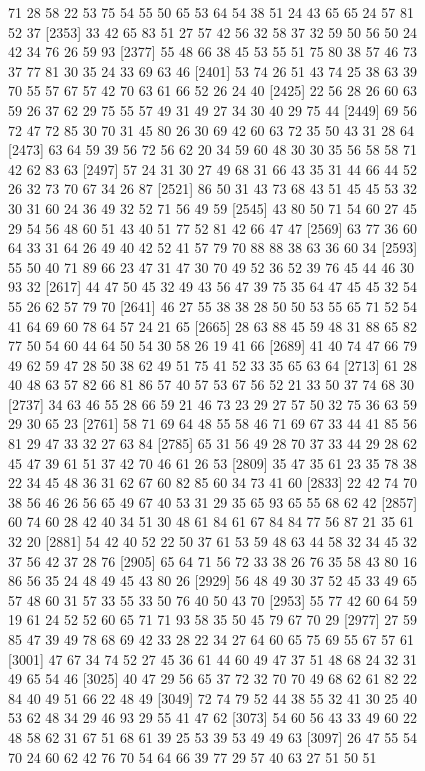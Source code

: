\documentclass{article}
\begin{document}
\begin{figure}[H]
\begin{Schunk}
\begin{Soutput}
 [2329] 71 28 58 22 53 75 54 55 50 65 53 64 54 38 51 24 43 65 65 24 57 81 52 37
 [2353] 33 42 65 83 51 27 57 42 56 32 58 37 32 59 50 56 50 24 42 34 76 26 59 93
 [2377] 55 48 66 38 45 53 55 51 75 80 38 57 46 73 37 77 81 30 35 24 33 69 63 46
 [2401] 53 74 26 51 43 74 25 38 63 39 70 55 57 67 57 42 70 63 61 66 52 26 24 40
 [2425] 22 56 28 26 60 63 59 26 37 62 29 75 55 57 49 31 49 27 34 30 40 29 75 44
 [2449] 69 56 72 47 72 85 30 70 31 45 80 26 30 69 42 60 63 72 35 50 43 31 28 64
 [2473] 63 64 59 39 56 72 56 62 20 34 59 60 48 30 30 35 56 58 58 71 42 62 83 63
 [2497] 57 24 31 30 27 49 68 31 66 43 35 31 44 66 44 52 26 32 73 70 67 34 26 87
 [2521] 86 50 31 43 73 68 43 51 45 45 53 32 30 31 60 24 36 49 32 52 71 56 49 59
 [2545] 43 80 50 71 54 60 27 45 29 54 56 48 60 51 43 40 51 77 52 81 42 66 47 47
 [2569] 63 77 36 60 64 33 31 64 26 49 40 42 52 41 57 79 70 88 88 38 63 36 60 34
 [2593] 55 50 40 71 89 66 23 47 31 47 30 70 49 52 36 52 39 76 45 44 46 30 93 32
 [2617] 44 47 50 45 32 49 43 56 47 39 75 35 64 47 45 45 32 54 55 26 62 57 79 70
 [2641] 46 27 55 38 38 28 50 50 53 55 65 71 52 54 41 64 69 60 78 64 57 24 21 65
 [2665] 28 63 88 45 59 48 31 88 65 82 77 50 54 60 44 64 50 54 30 58 26 19 41 66
 [2689] 41 40 74 47 66 79 49 62 59 47 28 50 38 62 49 51 75 41 52 33 35 65 63 64
 [2713] 61 28 40 48 63 57 82 66 81 86 57 40 57 53 67 56 52 21 33 50 37 74 68 30
 [2737] 34 63 46 55 28 66 59 21 46 73 23 29 27 57 50 32 75 36 63 59 29 30 65 23
 [2761] 58 71 69 64 48 55 58 46 71 69 67 33 44 41 85 56 81 29 47 33 32 27 63 84
 [2785] 65 31 56 49 28 70 37 33 44 29 28 62 45 47 39 61 51 37 42 70 46 61 26 53
 [2809] 35 47 35 61 23 35 78 38 22 34 45 48 36 31 62 67 60 82 85 60 34 73 41 60
 [2833] 22 42 74 70 38 56 46 26 56 65 49 67 40 53 31 29 35 65 93 65 55 68 62 42
 [2857] 60 74 60 28 42 40 34 51 30 48 61 84 61 67 84 84 77 56 87 21 35 61 32 20
 [2881] 54 42 40 52 22 50 37 61 53 59 48 63 44 58 32 34 45 32 37 56 42 37 28 76
 [2905] 65 64 71 56 72 33 38 26 76 35 58 43 80 16 86 56 35 24 48 49 45 43 80 26
 [2929] 56 48 49 30 37 52 45 33 49 65 57 48 60 31 57 33 55 33 50 76 40 50 43 70
 [2953] 55 77 42 60 64 59 19 61 24 52 52 60 65 71 71 93 58 35 50 45 79 67 70 29
 [2977] 27 59 85 47 39 49 78 68 69 42 33 28 22 34 27 64 60 65 75 69 55 67 57 61
 [3001] 47 67 34 74 52 27 45 36 61 44 60 49 47 37 51 48 68 24 32 31 49 65 54 46
 [3025] 40 47 29 56 65 37 72 32 70 70 49 68 62 61 82 22 84 40 49 51 66 22 48 49
 [3049] 72 74 79 52 44 38 55 32 41 30 25 40 53 62 48 34 29 46 93 29 55 41 47 62
 [3073] 54 60 56 43 33 49 60 22 48 58 62 31 67 51 68 61 39 25 53 39 53 49 49 63
 [3097] 26 47 55 54 70 24 60 62 42 76 70 54 64 66 39 77 29 57 40 63 27 51 50 51

\end{Soutput}
\end{Schunk}
\end{figure}
\end{document}
